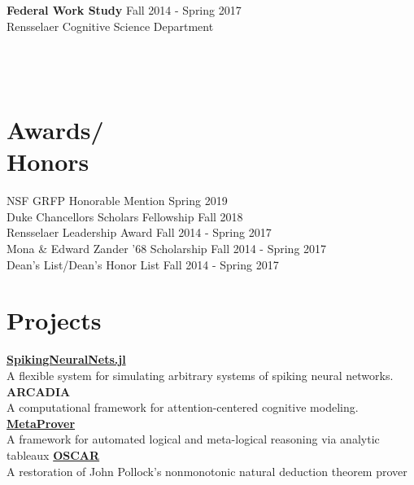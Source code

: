 \documentclass[margin]{res}
\begin{document}
\begin{resume}
  \textbf{Federal Work Study} \hfill Fall 2014 - Spring 2017 \\
  Rensselaer Cognitive Science Department \\


  
   \\
  
   \\
  
   \\

  \section{Awards/\\Honors}
  NSF GRFP Honorable Mention \hfill Spring 2019 \\
  Duke Chancellors Scholars Fellowship \hfill Fall 2018 \\
  Rensselaer Leadership Award \hfill Fall 2014 - Spring 2017 \\
  Mona \& Edward Zander '68 Scholarship \hfill Fall 2014 - Spring 2017 \\
  Dean's List/Dean's Honor List \hfill Fall 2014 - Spring 2017 \\
  
  \section{Projects}
  \href{https://github.com/pearsonlab/SpikingNeuralNets.jl}{\textbf{SpikingNeuralNets.jl}} \\
  A flexible system for simulating arbitrary systems of spiking neural networks. \\
  \textbf{ARCADIA} \\
  A computational framework for attention-centered cognitive modeling. 
  \href{https://github.com/kevingoneill/MetaProver}{\textbf{MetaProver}}
  \\ A framework for automated logical and meta-logical reasoning via
  analytic tableaux
  \href{http://rair.cogsci.rpi.edu/projects/automated-reasoners/oscar/}{\textbf{OSCAR}} \\
  A restoration of John Pollock's nonmonotonic natural deduction theorem prover \\


\end{resume}
\end{document}
